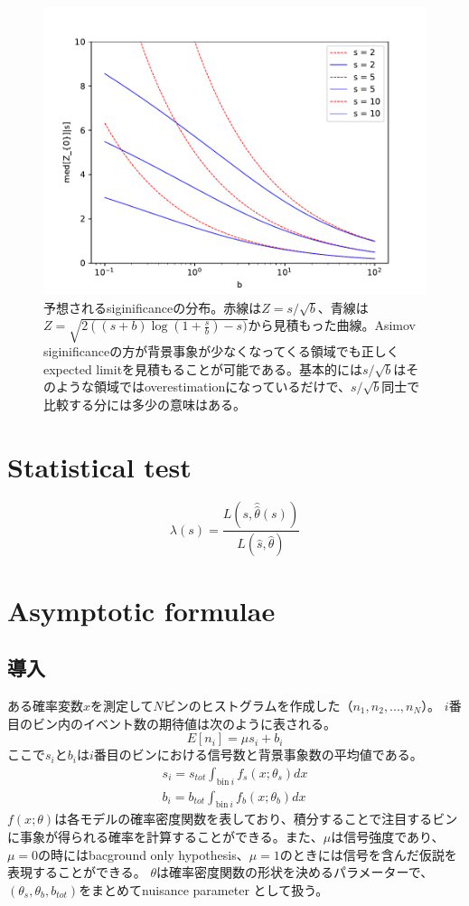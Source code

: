 \documentclass[a4paper,uplatex]{jsreport}
\begin{document}
\begin{figure}[h]
  \centering
  \includegraphics[scale=0.8]{python/discovery_significance.pdf}
  \caption{予想されるsiginificanceの分布。赤線は$Z=s/\sqrt{b}$、青線は$Z=\sqrt{2\left((s+b)\log\left({1+\frac{s}{b}}\right)-s)}$から見積もった曲線。Asimov siginificanceの方が背景事象が少なくなってくる領域でも正しくexpected limitを見積もることが可能である。基本的には$s/\sqrt{b}$はそのような領域ではoverestimationになっているだけで、$s/\sqrt{b}$同士で比較する分には多少の意味はある。}
\end{figure}


\section{Statistical test}

\begin{equation}
  \lambda(s) = \frac{L(s,\hat{\hat{\theta}}(s))}{L(\hat{s},\hat{\theta})}
\end{equation}


\section{Asymptotic formulae}
\subsection{導入}
ある確率変数$x$を測定して$N$ビンのヒストグラムを作成した（$n_1,n_2,...,n_N$）。
$i$番目のビン内のイベント数の期待値は次のように表される。
\begin{equation}
E[n_i] = \mu s_i + b_i
\end{equation}
ここで$s_i$と$b_i$は$i$番目のビンにおける信号数と背景事象数の平均値である。
\begin{eqnarray}
 s_i = s_{tot}\int_{\mathrm{bin}~i}f_s(x;\theta_s)dx \\
 b_i = b_{tot}\int_{\mathrm{bin}~i}f_b(x;\theta_b)dx
\end{eqnarray}
$f(x;\theta)$は各モデルの確率密度関数を表しており、積分することで注目するビンに事象が得られる確率を計算することができる。また、$\mu$は信号強度であり、$\mu=0$の時にはbacground only hypothesis、$\mu=1$のときには信号を含んだ仮説を表現することができる。
$\theta$は確率密度関数の形状を決めるパラメーターで、$(\theta_s,\theta_b,b_{tot})$をまとめてnuisance parameter として扱う。
\end{document}
